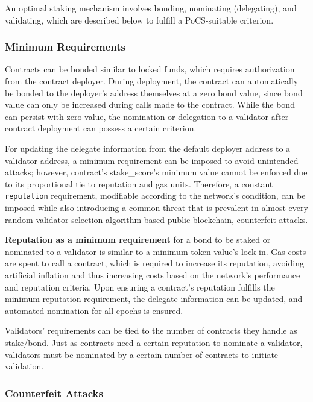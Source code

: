 \documentclass{article}
\begin{document}
An optimal staking mechanism involves bonding, nominating (delegating), and validating, which are described below to fulfill a PoCS-suitable criterion.

\subsubsection{Minimum Requirements}

Contracts can be bonded similar to locked funds, which requires authorization from the contract deployer. During deployment, the contract can automatically be bonded to the deployer's address themselves at a zero bond value, since bond value can only be increased during calls made to the contract. While the bond can persist with zero value, the nomination or delegation to a validator after contract deployment can possess a certain criterion. 

For updating the delegate information from the default deployer address to a validator address, a minimum requirement can be imposed to avoid unintended attacks; however, contract's stake\_score's minimum value cannot be enforced due to its proportional tie to reputation and gas units. Therefore, a constant \texttt{reputation} requirement, modifiable according to the network's condition, can be imposed while also introducing a common threat that is prevalent in almost every random validator selection algorithm-based public blockchain, counterfeit attacks.

\textbf{Reputation as a minimum requirement} for a bond to be staked or nominated to a validator is similar to a minimum token value's lock-in. Gas costs are spent to call a contract, which is required to increase its reputation, avoiding artificial inflation and thus increasing costs based on the network's performance and reputation criteria. Upon ensuring a contract's reputation fulfills the minimum reputation requirement, the delegate information can be updated, and automated nomination for all epochs is ensured.

Validators' requirements can be tied to the number of contracts they handle as stake/bond. Just as contracts need a certain reputation to nominate a validator, validators must be nominated by a certain number of contracts to initiate validation.

\subsubsection{Counterfeit Attacks}
\end{document}
